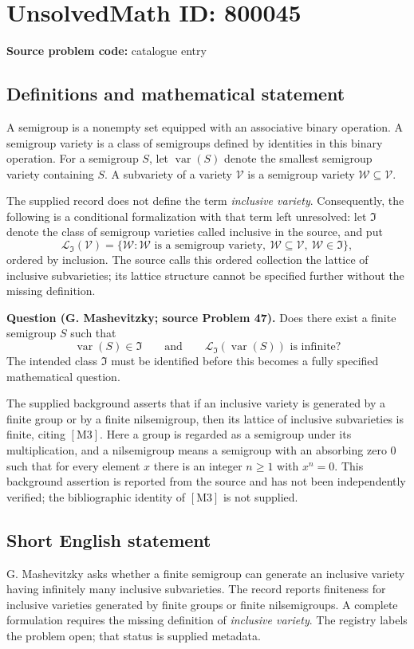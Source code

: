 \documentclass[11pt]{article}
\begin{document}
\section*{UnsolvedMath ID: 800045}
\textbf{Source problem code:} catalogue entry
\subsection{Definitions and mathematical statement}
A semigroup is a nonempty set equipped with an associative binary operation. A semigroup variety is a class of semigroups defined by identities in this binary operation. For a semigroup \(S\), let \(\operatorname{var}(S)\) denote the smallest semigroup variety containing \(S\). A subvariety of a variety \(\mathcal V\) is a semigroup variety \(\mathcal W\subseteq\mathcal V\).

The supplied record does not define the term \emph{inclusive variety}. Consequently, the following is a conditional formalization with that term left unresolved: let \(\mathfrak I\) denote the class of semigroup varieties called inclusive in the source, and put
\[
\mathcal L_{\mathfrak I}(\mathcal V)
=\{\mathcal W:\mathcal W\text{ is a semigroup variety},\ \mathcal W\subseteq\mathcal V,\ \mathcal W\in\mathfrak I\},
\]
ordered by inclusion. The source calls this ordered collection the lattice of inclusive subvarieties; its lattice structure cannot be specified further without the missing definition.

\textbf{Question (G. Mashevitzky; source Problem 47).} Does there exist a finite semigroup \(S\) such that
\[
\operatorname{var}(S)\in\mathfrak I
\qquad\text{and}\qquad
\mathcal L_{\mathfrak I}(\operatorname{var}(S))\text{ is infinite}?
\]
The intended class \(\mathfrak I\) must be identified before this becomes a fully specified mathematical question.

The supplied background asserts that if an inclusive variety is generated by a finite group or by a finite nilsemigroup, then its lattice of inclusive subvarieties is finite, citing \([\mathrm{M3}]\). Here a group is regarded as a semigroup under its multiplication, and a nilsemigroup means a semigroup with an absorbing zero \(0\) such that for every element \(x\) there is an integer \(n\geq 1\) with \(x^n=0\). This background assertion is reported from the source and has not been independently verified; the bibliographic identity of \([\mathrm{M3}]\) is not supplied.
\subsection{Short English statement}
G. Mashevitzky asks whether a finite semigroup can generate an inclusive variety having infinitely many inclusive subvarieties. The record reports finiteness for inclusive varieties generated by finite groups or finite nilsemigroups. A complete formulation requires the missing definition of \emph{inclusive variety}. The registry labels the problem open; that status is supplied metadata.
\end{document}
